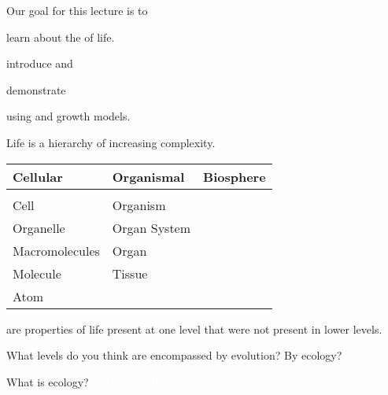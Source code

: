 \documentclass[t,handout]{beamer}  %
\newcommand{\ccbysa}[1]{%
	\ifx&#1&
	{\textsc{cc by-sa}}%
\else
	{\textsc{cc by-sa #1.0}} 
\fi}
\begin{document}

\begin{frame}{Our goal for this lecture is to }

	\hangpara learn about the  of life.
	
	\hangpara introduce  and
	
	\hangpara demonstrate 
	
	\hangpara using  and  growth models.

\end{frame}
%
\begin{frame}{Life is a hierarchy of increasing complexity.}
\vspace*{-0.5\baselineskip}	
\hangpara \begin{tabular}{@{}L{34mm}L{34mm}L{34mm}@{}}
\toprule
{}Cellular 	&
Organismal 		&
Biosphere 		\\
\midrule
&	&	\\
Cell		&
Organism	&
\\[1em]
%
Organelle		&
Organ System	&
\\[1em]
%
Macromolecules	&
Organ			&
 \\[1em]
%
Molecule		&
Tissue			&
	\\[1em]
%
Atom			&
						&
\\[1em]
\end{tabular}


\hangpara{} are properties of life present at one level that were not present in lower levels.

\hangpara What levels do you think are encompassed by evolution?  By ecology? 
\end{frame}
%
{
\begin{frame}[b]{\hfill What is ecology?}
	\tiny\textcolor{white}{Jeff Taylor, Wikimedia, \ccbysa{3}.}%
\end{frame}
}
\end{document}
